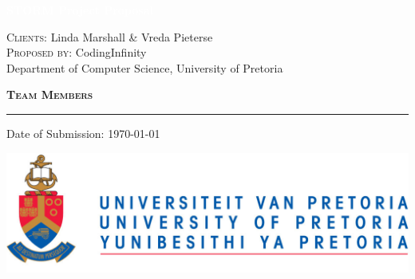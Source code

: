 \documentclass[11pt,a4paper,sans]{article}
\begin{document}
\begin{titlepage}
\BgThispage
{}
\vspace*{0.1\textheight}
\noindent
\textcolor{white}{\Huge\textbf{\textsf{STORM Project Proposal}}}
\vspace*{4cm}
\noindent
\begin{center}
			\textsc{Clients:} {\huge Linda Marshall \& Vreda Pieterse} \\
			\vspace*{0.3cm}
			\textsc{Proposed by:} {\huge CodingInfinity} \\
			\vspace*{0.1cm}
			\small Department of Computer Science, University of Pretoria \\
			\hfill
\end{center}
\vspace*{1.5cm}
\begin{minipage}{0.35\linewidth}
		\begin{center}
			\textsc{\textbf{Team Members}}
		\end{center}
    \begin{flushright}
        
    \end{flushright}
\end{minipage} \hspace{15pt}
\begin{minipage}{0.02\linewidth}
    \rule{1pt}{140pt}
\end{minipage} \hspace{-10pt}
\begin{minipage}{0.63\linewidth}
\vspace{5pt}
	\begin{abstract}
		Lecturers of the department of Computer Science at the University of Pretoria, require a system to be developed to shuffle teams. The system is going to be used by the lecturers of the Software Engineering module (COS301) to determine teams for the “Rocking the boat” exercise of the Software Engineering module using a set of lecturer defined criteria to select the teams.

		This proposal is made in request to the call for tenders published by Linda Marshall \& Vreda Pieterse through the University of Pretoria.  
	\end{abstract}
\end{minipage}

\vspace*{1cm}
{\large Date of Submission:} \today
\vfill
\begin{minipage}{\linewidth}
	\begin{center}
		\includegraphics[scale=0.3]{UP_Logo}
	\end{center}
\end{minipage}
\end{titlepage}
\end{document}
